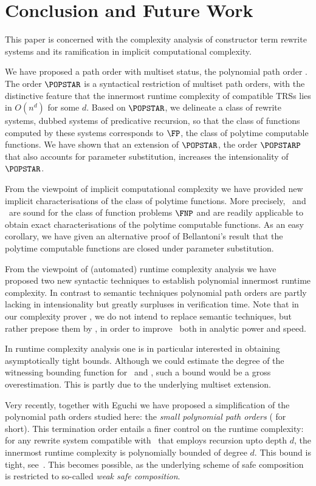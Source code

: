 \documentclass{LMCS}
\begin{document}
\section{Conclusion and Future Work}\label{s:conclusion}

This paper is concerned with the complexity analysis of
constructor term rewrite systems and its ramification in implicit
computational complexity.

We have proposed a path order with multiset status, 
the polynomial path order \POPSTAR. 
The order $\POPSTAR$ is a syntactical restriction of multiset path orders, 
with the distinctive feature that the innermost runtime complexity
of compatible TRSs lies in $O(n^d)$ for some $d$.
Based on $\POPSTAR$, we delineate a class of rewrite systems, dubbed
systems of predicative recursion, 
so that the class of functions computed by these systems
corresponds to $\FP$, the class of polytime computable functions.
We have shown that an extension of $\POPSTAR$, the order $\POPSTARP$
that also accounts for parameter substitution, 
increases the intensionality of $\POPSTAR$.

From the viewpoint of implicit computational complexity we
have provided new implicit characterisations of the
class of polytime functions. More precisely, \POPSTAR\ and \POPSTARP\ 
are sound for the class of function problems $\FNP$ and are readily
applicable to obtain exact characterisations of the polytime
computable functions. As an easy corollary, we have given
an alternative proof of Bellantoni's result that the polytime
computable functions are closed under parameter substitution. 

From the viewpoint of (automated) runtime complexity analysis
we have proposed two new syntactic techniques to establish
polynomial innermost runtime complexity. 
In contrast to semantic techniques polynomial path orders 
are partly lacking in intensionality but greatly surpluses
in verification time. Note that in our complexity prover \TCT, we do not intend to replace 
semantic techniques, but rather prepose them by \POPSTARP, in 
order to improve \TCT\ both in analytic power and speed. 

In runtime complexity analysis one is in particular interested 
in obtaining asymptotically tight bounds. 
Although we could estimate the degree of the witnessing
bounding function for \POPSTAR\ and \POPSTARP, 
such a bound would be a gross overestimation.
This is partly due to the underlying multiset extension.

Very recently, together with Eguchi we have proposed a
simplification of the polynomial path orders studied here: 
the \emph{small polynomial path orders} (\emph{\POPSTARS} for short).
This termination order entails a finer control on the runtime
complexity: for any rewrite system compatible with \POPSTARS\
that employs recursion upto depth $d$, the innermost runtime complexity 
is polynomially bounded of degree $d$. This bound is tight,
see~\cite{AEM12}.
This becomes possible, as the underlying scheme of safe composition
is restricted to so-called \emph{weak safe composition}.
\end{document}
